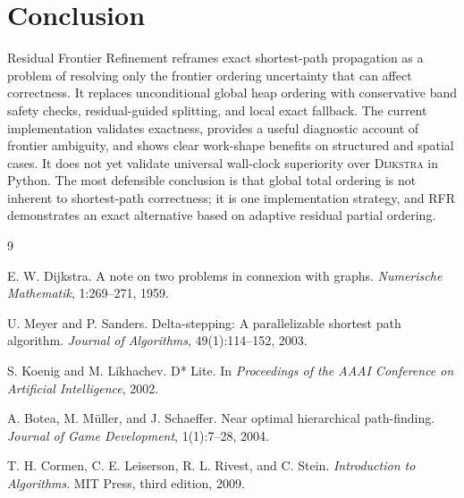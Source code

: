 \documentclass[11pt]{article}
\newcommand{\RFR}{\textsc{RFR}}
\newcommand{\Dijkstra}{\textsc{Dijkstra}}
\begin{document}
\section{Conclusion}

Residual Frontier Refinement reframes exact shortest-path propagation as a problem of resolving only the frontier ordering uncertainty that can affect correctness. It replaces unconditional global heap ordering with conservative band safety checks, residual-guided splitting, and local exact fallback. The current implementation validates exactness, provides a useful diagnostic account of frontier ambiguity, and shows clear work-shape benefits on structured and spatial cases. It does not yet validate universal wall-clock superiority over \Dijkstra{} in Python. The most defensible conclusion is that global total ordering is not inherent to shortest-path correctness; it is one implementation strategy, and \RFR{} demonstrates an exact alternative based on adaptive residual partial ordering.

\begin{thebibliography}{9}

E. W. Dijkstra.
\newblock A note on two problems in connexion with graphs.
\newblock \emph{Numerische Mathematik}, 1:269--271, 1959.

U. Meyer and P. Sanders.
\newblock Delta-stepping: A parallelizable shortest path algorithm.
\newblock \emph{Journal of Algorithms}, 49(1):114--152, 2003.

S. Koenig and M. Likhachev.
\newblock D* Lite.
\newblock In \emph{Proceedings of the AAAI Conference on Artificial Intelligence}, 2002.

A. Botea, M. M\"uller, and J. Schaeffer.
\newblock Near optimal hierarchical path-finding.
\newblock \emph{Journal of Game Development}, 1(1):7--28, 2004.

T. H. Cormen, C. E. Leiserson, R. L. Rivest, and C. Stein.
\newblock \emph{Introduction to Algorithms}.
\newblock MIT Press, third edition, 2009.

\end{thebibliography}
\end{document}
